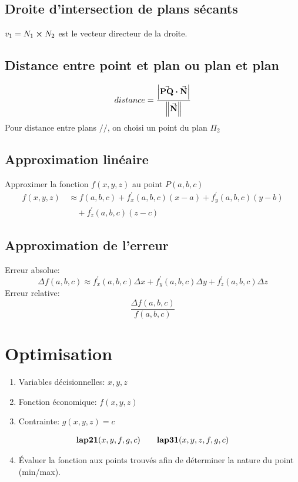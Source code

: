 \subsection{Droite d'intersection de plans sécants}
\centering
\( v_1 = N_1 \cp N_2 \) est le vecteur directeur de la droite.

\subsection{Distance entre point et plan ou plan et plan}
\raggedright
\begin{equation*}
    distance = \frac{\abs{\va{PQ}\vdot\va{N}}}{\norm{\va{N}}}
\end{equation*}
Pour distance entre plans $//$, on choisi un point du plan $\Pi_2$

\subsection{Approximation linéaire}
Approximer la fonction $f(x,y,z)$ au point $P(a,b,c)$
\begin{align*}
    f(x,y,z)\, &\approx f(a,b,c) + f^\prime_x(a,b,c)(x-a) + f^\prime_y(a,b,c)(y-b) \\ &\quad+ f^\prime_z(a,b,c)(z-c)
\end{align*}

\subsection{Approximation de l'erreur}
Erreur absolue:
\[ \Delta f(a,b,c) \approx f^\prime_x(a,b,c) \Delta x + f^\prime_y(a,b,c) \Delta y + f^\prime_z(a,b,c) \Delta z \]
Erreur relative: \[ \frac{\Delta f(a,b,c)}{f(a,b,c)}\]


\section{Optimisation}
\begin{enumerate}[nosep]
    \item Variables décisionnelles: $x,y,z$
    \item Fonction économique: $f(x,y,z)$
    \item Contrainte: $g(x,y,z)=c$
\end{enumerate}%
\begin{gather*}
    \mathbf{lap21}\qty(x,y,f,g,c) \qq{} \mathbf{lap31}\qty(x,y,z,f,g,c)
\end{gather*}
\begin{enumerate}[nosep]
\setcounter{enumi}{3}
    \item Évaluer la fonction aux points trouvés afin de déterminer la nature du point (min/max).
\end{enumerate}